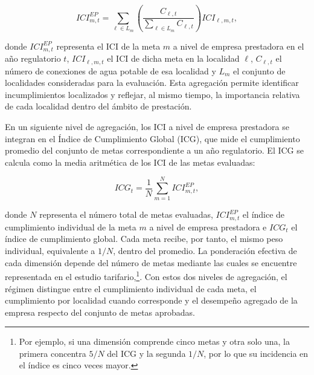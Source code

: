 \begin{equation} 
ICI^{EP}_{m,t} 
= 
\sum_{\ell \in L_m} 
\left( 
\frac{C_{\ell,t}} 
{\sum_{\ell \in L_m}C_{\ell,t}} 
\right) 
ICI_{\ell,m,t}, 
\end{equation} 
 
donde \(ICI^{EP}_{m,t}\) representa el ICI de la meta \(m\) a nivel de empresa prestadora en el año regulatorio \(t\), \(ICI_{\ell,m,t}\) el ICI de dicha meta en la localidad \(\ell\), \(C_{\ell,t}\) el número de conexiones de agua potable de esa localidad y \(L_m\) el conjunto de localidades consideradas para la evaluación. Esta agregación permite identificar incumplimientos localizados y reflejar, al mismo tiempo, la importancia relativa de cada localidad dentro del ámbito de prestación. 
 
En un siguiente nivel de agregación, los ICI a nivel de empresa prestadora se integran en el Índice de Cumplimiento Global (ICG), que mide el cumplimiento promedio del conjunto de metas correspondiente a un año regulatorio. El ICG se calcula como la media aritmética de los ICI de las metas evaluadas: 
 
\begin{equation} 
ICG_t 
= 
\frac{1}{N} 
\sum_{m=1}^{N} 
ICI^{EP}_{m,t}, 
\end{equation} 
 
donde \(N\) representa el número total de metas evaluadas, \(ICI^{EP}_{m,t}\) el índice de cumplimiento individual de la meta \(m\) a nivel de empresa prestadora e \(ICG_t\) el índice de cumplimiento global. Cada meta recibe, por tanto, el mismo peso individual, equivalente a \(1/N\), dentro del promedio. La ponderación efectiva de cada dimensión depende del número de metas mediante las cuales se encuentre representada en el estudio tarifario,\footnote{Por ejemplo, si una dimensión comprende cinco metas y otra solo una, la primera concentra \(5/N\) del ICG y la segunda \(1/N\), por lo que su incidencia en el índice es cinco veces mayor.}. Con estos dos niveles de agregación, el régimen distingue entre el cumplimiento individual de cada meta, el cumplimiento por localidad cuando corresponde y el desempeño agregado de la empresa respecto del conjunto de metas aprobadas. 
 
